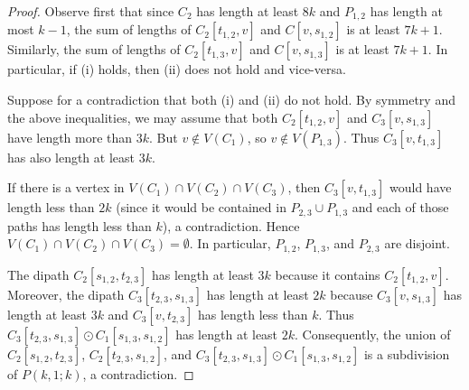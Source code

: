 \documentclass[utf8,10pt]{article}
\theoremstyle{plain}
\theoremstyle{definition}
\theoremstyle{remark}
\begin{document}
\begin{proof}
Observe first that since $C_2$ has length at least $8k$ and $P_{1,2}$ has length at most $k-1$, the sum of lengths of $C_2[t_{1,2}, v]$ and  $C[v, s_{1,2}]$ is at least $7k+1$. Similarly, the sum of lengths of $C_2[t_{1,3}, v]$ and $C[v, s_{1,3}]$ is at least $7k+1$. In particular, if (i) holds, then (ii) does not hold and vice-versa.


Suppose for a contradiction that both (i) and (ii) do not hold. By symmetry and the above inequalities, we may assume that both $C_2[t_{1,2}, v]$ and $C_3[v, s_{1,3}]$ have length more than $3k$.
But $v\notin V(C_1)$, so $v\notin V(P_{1,3})$. Thus $C_3[v, t_{1,3}]$  has also length at least $3k$. 

If there is a vertex in $V(C_1)\cap V(C_2)\cap V(C_3)$, then $C_3[v,t_{1,3}]$ would have length less than $2k$ (since it would be contained in $P_{2,3}\cup P_{1,3}$ and each of those paths has length less than $k$), a contradiction.
Hence $V(C_1)\cap V(C_2)\cap V(C_3)=\emptyset$. In particular, $P_{1,2}$, $P_{1,3}$, and $P_{2,3}$ are disjoint.

The dipath  $C_2[s_{1,2}, t_{2,3}]$ has length at least $3k$ because it contains $C_2[t_{1,2},v]$. Moreover, the dipath $C_3[t_{2,3}, s_{1,3}]$ 
has length at least $2k$ because $C_3[v, s_{1,3}]$ has length at least $3k$ and $C_3[v,t_{2,3}]$ has length less than $k$.
Thus $C_3[t_{2,3}, s_{1,3}]\odot C_1[s_{1,3}, s_{1,2}]$ has length at least $2k$.
Consequently, the union of $C_2[s_{1,2}, t_{2,3}]$, $C_2[t_{2,3}, s_{1,2}]$, and $C_3[t_{2,3}, s_{1,3}]\odot C_1[s_{1,3}, s_{1,2}]$  is a subdivision of $P(k,1;k)$, a contradiction.
\end{proof}



\end{document}
